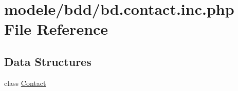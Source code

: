 \hypertarget{bd_8contact_8inc_8php}{}\section{modele/bdd/bd.contact.\+inc.\+php File Reference}
\label{bd_8contact_8inc_8php}
\subsection*{Data Structures}
\begin{DoxyCompactItemize}
\item 
class \hyperlink{class_contact}{Contact}
\end{DoxyCompactItemize}
